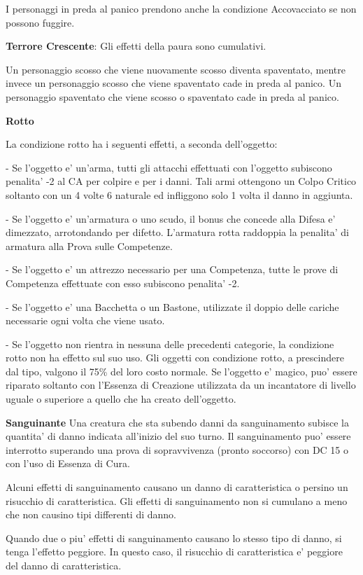 \documentclass[a4paper,11pt,twoside,openany]{book}
\begin{document}
{I personaggi in preda al panico prendono anche la condizione Accovacciato se non possono fuggire.

\textbf{Terrore Crescente}: Gli effetti della paura sono cumulativi.

Un personaggio scosso che viene nuovamente scosso diventa spaventato, mentre invece un personaggio scosso che viene spaventato cade in preda al panico. Un personaggio spaventato che viene scosso o spaventato cade in preda al panico.

\textbf{Rotto}

La condizione rotto ha i seguenti effetti, a seconda dell'oggetto:

- Se l'oggetto e' un'arma, tutti gli attacchi effettuati con l'oggetto
subiscono penalita' -2 al CA per colpire e per i danni. Tali armi
ottengono un Colpo Critico soltanto con un 4 volte 6 naturale ed infliggono
solo 1 volta il danno in aggiunta.

- Se l'oggetto e' un'armatura o uno scudo, il bonus che concede alla
Difesa e' dimezzato, arrotondando per difetto. L'armatura rotta raddoppia
la penalita' di armatura alla Prova sulle Competenze.

- Se l'oggetto e' un attrezzo necessario per una Competenza, tutte
le prove di Competenza effettuate con esso subiscono penalita' -2.

- Se l'oggetto e' una Bacchetta o un Bastone, utilizzate il doppio
delle cariche necessarie ogni volta che viene usato.

- Se l'oggetto non rientra in nessuna delle precedenti categorie,
la condizione rotto non ha effetto sul suo uso. Gli oggetti con condizione
rotto, a prescindere dal tipo, valgono il 75\% del loro costo normale.
Se l'oggetto e' magico, puo' essere riparato soltanto con l'Essenza
di Creazione utilizzata da un incantatore di livello uguale o superiore
a quello che ha creato dell'oggetto.

\textbf{Sanguinante} Una creatura che sta subendo danni da sanguinamento subisce la quantita' di danno indicata all'inizio del suo turno. Il sanguinamento puo' essere interrotto superando una prova di sopravvivenza (pronto soccorso) con DC 15 o con l'uso di Essenza di Cura.

Alcuni effetti di sanguinamento causano un danno di caratteristica o persino un risucchio di caratteristica. Gli effetti di sanguinamento non si cumulano a meno che non causino tipi differenti di danno.

Quando due o piu' effetti di sanguinamento causano lo stesso tipo di danno, si tenga l'effetto peggiore. In questo caso, il risucchio di caratteristica e' peggiore del danno di caratteristica.

}
\end{document}

